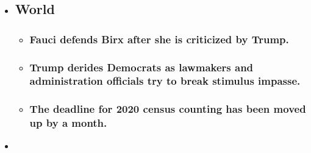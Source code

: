 \begin{itemize}
\item
  \href{https://www.nytimes.com/2020/08/03/world/coronavirus-covid-19.html?type=styln-live-updates\&label=world\&index=0}{}

  \hypertarget{world}{%
  \subsection{World}\label{world}}

  \begin{itemize}
  \item
    \href{https://www.nytimes.com/2020/08/03/world/coronavirus-covid-19.html?type=styln-live-updates\&label=world\&index=0\#link-4547638f}{}

    \hypertarget{fauci-defends-birx-after-she-is-criticized-by-trump}{%
    \subsubsection{Fauci defends Birx after she is criticized by
    Trump.}\label{fauci-defends-birx-after-she-is-criticized-by-trump}}
  \item
    \href{https://www.nytimes.com/2020/08/03/world/coronavirus-covid-19.html?type=styln-live-updates\&label=world\&index=0\#link-15e7f995}{}

    \hypertarget{trump-derides-democrats-as-lawmakers-and-administration-officials-try-to-break-stimulus-impasse}{%
    \subsubsection{Trump derides Democrats as lawmakers and
    administration officials try to break stimulus
    impasse.}\label{trump-derides-democrats-as-lawmakers-and-administration-officials-try-to-break-stimulus-impasse}}
  \item
    \href{https://www.nytimes.com/2020/08/03/world/coronavirus-covid-19.html?type=styln-live-updates\&label=world\&index=0\#link-e5a2cda}{}

    \hypertarget{the-deadline-for-2020-census-counting-has-been-moved-up-by-a-month}{%
    \subsubsection{The deadline for 2020 census counting has been moved
    up by a
    month.}\label{the-deadline-for-2020-census-counting-has-been-moved-up-by-a-month}}
  \end{itemize}
\item
  \href{https://www.nytimes.com/live/2020/08/03/business/stock-market-today-coronavirus?type=styln-live-updates\&label=business\&index=1}{}


\end{itemize}
